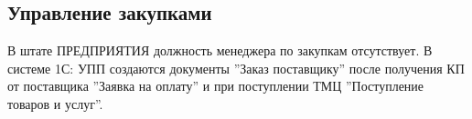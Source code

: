 \newpage
\subsection{Управление закупками}
В штате ПРЕДПРИЯТИЯ должность менеджера по закупкам отсутствует. 
В системе 1С: УПП создаются документы ''Заказ поставщику'' после получения КП от поставщика ''Заявка на оплату'' и при поступлении ТМЦ ''Поступление товаров и услуг''.
\clearpage

